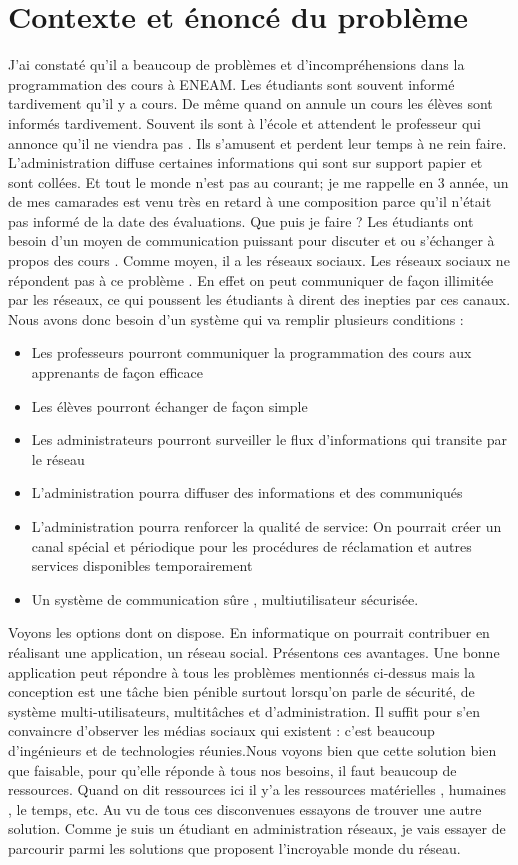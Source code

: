 \documentclass[a4paper,12pt,french]{report} %
\begin{document}
	\section{Contexte et énoncé du problème}	
	J'ai constaté qu'il a beaucoup de problèmes et d'incompréhensions dans la programmation des cours à ENEAM\label{ref:eneam}. Les étudiants sont souvent informé tardivement qu'il y a cours. De même quand on annule un cours les élèves sont informés tardivement. Souvent ils sont à l'école et attendent le professeur qui annonce qu'il ne viendra pas . Ils s'amusent et perdent leur temps à ne rein faire. L'administration diffuse certaines informations qui sont sur support papier et sont collées. Et tout le monde n'est pas au courant; je me rappelle en 3 année, un de mes camarades est venu très en retard à une composition parce qu'il n'était pas informé de la date des évaluations. Que puis je faire ? Les étudiants ont besoin d'un moyen de communication puissant pour discuter et ou s'échanger à propos des cours . Comme moyen, il a les réseaux sociaux. Les réseaux sociaux ne répondent pas à ce problème . En effet on peut communiquer de façon illimitée par les réseaux, ce qui poussent les étudiants à dirent des inepties par ces canaux. Nous avons donc besoin d'un système qui va remplir plusieurs conditions :
\begin{itemize}
	\item Les professeurs pourront communiquer la programmation des cours aux apprenants de façon efficace
	\item Les élèves pourront échanger de façon simple
	\item Les administrateurs pourront surveiller le flux d'informations qui transite par le réseau
	\item L'administration pourra diffuser des informations et des communiqués 
	\item L'administration pourra renforcer la qualité de service: On pourrait créer un canal spécial et périodique pour les procédures de réclamation et autres services disponibles temporairement
	\item Un système de communication sûre , multiutilisateur sécurisée. 
\end{itemize}

	Voyons les options dont on dispose. En informatique on pourrait contribuer en réalisant une application, un réseau social.
Présentons ces avantages. Une bonne application peut répondre à tous les problèmes mentionnés ci-dessus mais la conception est une tâche bien pénible surtout lorsqu'on parle de sécurité, de système multi-utilisateurs, multitâches et d'administration. Il suffit pour s'en convaincre d'observer les médias sociaux qui existent : c'est beaucoup d'ingénieurs et de technologies réunies.Nous voyons bien que cette solution bien que faisable, pour qu'elle réponde à tous nos besoins,  il faut beaucoup de ressources. Quand on dit ressources ici il y'a les ressources matérielles , humaines , le temps, etc. Au vu de tous ces disconvenues essayons de trouver une autre solution. Comme je suis un étudiant en administration réseaux, je vais essayer de parcourir parmi les solutions que proposent l'incroyable monde du réseau.
\end{document}

